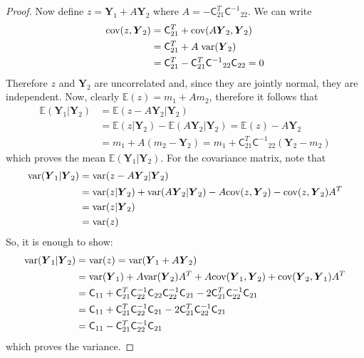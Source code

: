 \documentclass[smallextended]{svjour3}       %
\newcommand{\bm}[1]{\boldsymbol{#1}}
\newcommand{\Ex}{\mathbb{E}}
\newcommand{\vY}{\bm{Y}}
\newcommand{\mC}{\mathsf{C}}
\newcommand{\mCInv}{{\mathsf{C}^{-1}}}
\newcommand{\cov}{{\textup{cov}}}
\newcommand{\var}{{\textup{var}}}
\begin{document}
\begin{proof}
Now define $z=\vY_1+ A \vY_2$ where $A=-\mC_{21}^T \mCInv_{22}$. We can write
\begin{align*}
\cov(z,\vY_2) &= \mC_{21}^T + \cov(A\vY_2,\vY_2)
\\
&=\mC_{21}^T + A \; \var(\vY_2)
\\
&=\mC_{21}^T-\mC_{21}^T\mCInv_{22}\mC_{22}=0
\end{align*}
Therefore $z$ and $\vY_2$ are uncorrelated and, since they are jointly normal, they are independent. Now, clearly $\Ex(z) = m_1 + A m_2$, therefore it follows that
\begin{align*}
\Ex(\vY_1 \vert \vY_2) &= \Ex(z - A \vY_2 \vert \vY_2) 
\\
& = \Ex(z \vert \vY_2) - \Ex(A \vY_2 \vert \vY_2) 
= \Ex(z)-A\vY_2 
\\
& = m_1 + A (m_2-\vY_2)=  m_1+ \mC_{21}^T \mCInv_{22}(\vY_2 - m_2)
\end{align*}
which proves the mean $\Ex(\vY_1 \vert \vY_2)$. For the covariance matrix, note that
\begin{align*}
\var(\vY_1|\vY_2) &=\var(z - A\vY_2|\vY_2)
\\
& =\var(z|\vY_2)+\var(A\vY_2|\vY_2) - A \cov(z, \vY_2) - \cov(z, \vY_2)A^T
\\
& =\var(z|\vY_2)
\\
&=\var(z)
\end{align*}
So, it is enough to show:
\begin{align*}
\var(\vY_1|\vY_2) & =\var(z) =\var(\vY_1+A\vY_2)
\\
 & =\var(\vY_1)+A\var(\vY_2)A^T + A \cov(\vY_1,\vY_2) + \cov(\vY_2,\vY_1)A^T
\\
&=\mC_{11}+\mC_{21}^T\mC_{22}^{-1}\mC_{22}\mC_{22}^{-1}\mC_{21}-2\mC_{21}^T\mC_{22}^{-1}\mC_{21}
\\
&=\mC_{11}+\mC_{21}^T\mC_{22}^{-1}\mC_{21}-2\mC_{21}^T\mC_{22}^{-1}\mC_{21}
\\
&=\mC_{11}-\mC_{21}^T\mC_{22}^{-1}\mC_{21}
\end{align*}
which proves the variance.


\end{proof}









\iffalse
\end{document}
